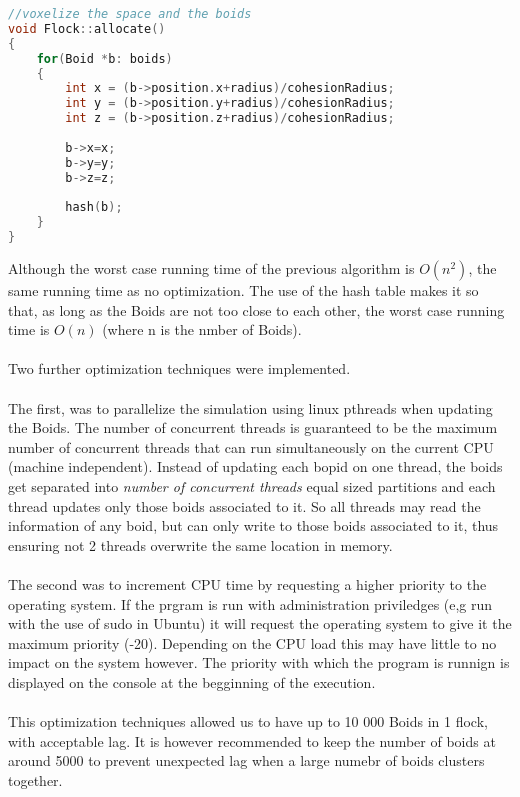 \documentclass[12pt]{article}
\begin{document}
\begin{minipage}[t]{\textwidth}
\begin{lstlisting}[language=C++]
//voxelize the space and the boids
void Flock::allocate()
{
	for(Boid *b: boids)
	{
		int x = (b->position.x+radius)/cohesionRadius;
		int y = (b->position.y+radius)/cohesionRadius;
		int z = (b->position.z+radius)/cohesionRadius;
		
		b->x=x;
		b->y=y;
		b->z=z;
		
		hash(b);
	}
}
\end{lstlisting}
\end{minipage}

Although the worst case running time of the previous algorithm is $O(n^2)$, the same running time as no optimization. The use of the hash table makes it so that, as long as the Boids are not too close to each other, the worst case running time is $O(n)$ (where n is the nmber of Boids).
\\ \\

Two further optimization techniques were implemented. 
\\ \\
The first, was to  parallelize the simulation using linux pthreads when updating the Boids. The number of concurrent threads is guaranteed to be the maximum number of concurrent threads that can run simultaneously on the current CPU (machine independent). Instead of updating each bopid on one thread, the boids get separated into \textit{number of concurrent threads} equal sized partitions and each thread updates only those boids associated to it. So all threads may read the information of any boid, but can only write to those boids associated to it, thus ensuring not 2 threads overwrite the same location in memory.
\\ \\
The second was to increment CPU time by requesting a higher priority to the operating system. If the prgram is run with administration priviledges (e,g run with the use of sudo in Ubuntu) it will request the operating system to give it the maximum priority (-20). Depending on the CPU load this may have little to no impact on the system however. The priority with which the program is runnign is displayed on the console at the begginning of the execution.
\\ \\
This optimization techniques allowed us to have up to 10 000 Boids in 1 flock, with acceptable lag.
It is however recommended to keep the number of boids at around 5000 to prevent unexpected lag when a large numebr of boids clusters together.
\end{document}
